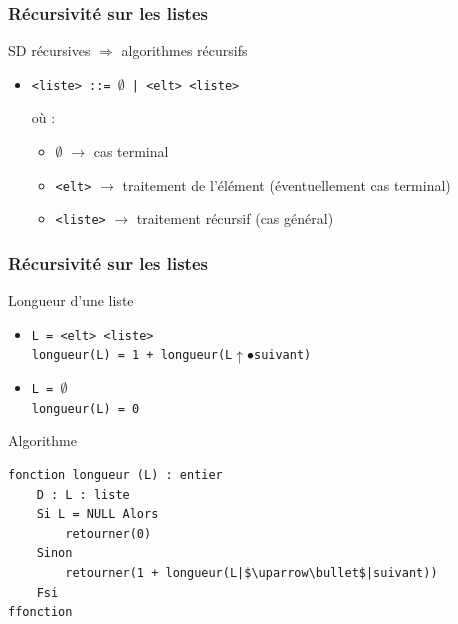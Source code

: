 \documentclass[table,handout,tikz,12pt,svgnames]{beamer}
\begin{document}
\begin{frame}[fragile=singleslide]
	\frametitle{Récursivité sur les listes}
	\begin{block}{SD récursives $\Rightarrow$ algorithmes récursifs} %
		\begin{itemize}
			\item \texttt{<liste> ::= $\emptyset$	|	<elt> <liste>} \\
			\vspace{0.5cm}
			
			où :
			\begin{itemize}			
			\item $\emptyset$ $\rightarrow$ cas terminal
			\item \texttt{<elt>} $\rightarrow$ traitement de l'élément (éventuellement cas terminal)
			\item \texttt{<liste>} $\rightarrow$ traitement récursif (cas général)
			\end{itemize}
		\end{itemize}
	\end{block}
\end{frame}

\begin{frame}[fragile=singleslide]
	\frametitle{Récursivité sur les listes}
	\begin{block}{Longueur d'une liste} %
		\begin{itemize}
			\item \texttt{L = <elt> <liste>} \\ \texttt{longueur(L) = 1 + longueur(L$\uparrow\bullet$suivant)}
			\item \texttt{L = $\emptyset$} \\ \texttt{longueur(L) = 0}
		\end{itemize}
	\end{block}
	\begin{block}{Algorithme} %
		\begin{verbatim}
fonction longueur (L) : entier
	D : L : liste
	Si L = NULL Alors
		retourner(0)
	Sinon
		retourner(1 + longueur(L|$\uparrow\bullet$|suivant))
	Fsi
ffonction
		\end{verbatim}
	\end{block}
\end{frame}
\end{document}
